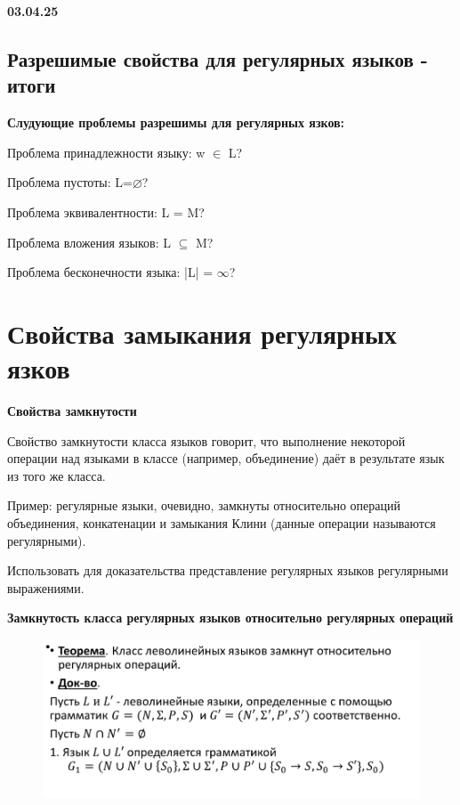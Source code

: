\documentclass{article}
\begin{document}
\textbf{03.04.25}

\subsection{Разрешимые свойства для регулярных языков - итоги}


\textbf{Слудующие проблемы разрешимы для регулярных язков:}

Проблема принадлежности языку: w $\in$ L?

 Проблема пустоты: L=$\varnothing$?

 Проблема эквивалентности: L = M?

 Проблема вложения языков: L $\subseteq $ M?

 Проблема бесконечности языка: |L| = $\infty$?

 \section{Свойства замыкания регулярных язков}

 \textbf{Свойства замкнутости}


 Свойство замкнутости класса языков говорит, что выполнение
некоторой операции над языками в классе (например,
объединение) даёт в результате язык из того же класса.

Пример: регулярные языки, очевидно, замкнуты относительно
операций объединения, конкатенации и замыкания Клини
(данные операции называются регулярными).

Использовать для доказательства представление регулярных языков
регулярными выражениями.


\textbf{Замкнутость класса регулярных языков относительно регулярных операций}


\begin{figure}[H]
    \centering
    \includegraphics[width=1\linewidth]{Снимок экрана 2025-04-03 083232.png}
\end{figure}
\end{document}
